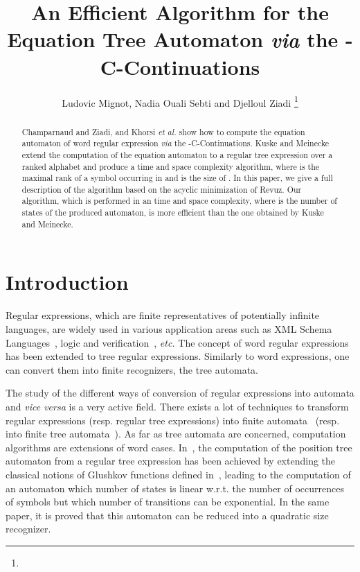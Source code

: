 \documentclass{llncs}
\begin{document}
\title{An Efficient Algorithm for the Equation Tree Automaton \emph{via} the -C-Continuations}
\author{Ludovic Mignot, Nadia Ouali Sebti and Djelloul Ziadi  \thanks{}}



\maketitle

\begin{abstract}
  Champarnaud and Ziadi, and Khorsi \emph{et al.} show how to compute the equation automaton of word regular expression  \emph{via} the -C-Continuations.
  Kuske and Meinecke extend the computation of the equation automaton to a regular tree expression  over a ranked alphabet  and produce a  time and space complexity algorithm, where  is the maximal rank of a symbol  occurring  in  and  is the size of . In this paper, we give a full description of the algorithm based on the acyclic minimization of Revuz. Our algorithm, which is performed in an  time and space complexity, where  is the number of states of the produced automaton, is more efficient than the one obtained by Kuske and Meinecke.
\end{abstract}

\section{Introduction}

Regular expressions, which are finite representatives of potentially infinite languages, are widely used in various application areas such as XML Schema Languages~\cite{xml}, logic and verification~\cite{verif}, \emph{etc.} The concept of word regular expressions  has been extended to tree regular expressions. Similarly to word expressions, one can convert them into  finite recognizers, the tree automata.
 
 The study of the different  ways of conversion of regular expressions into automata and \emph{vice versa} is a very  active  field. There exists a lot  of techniques to transform regular expressions (resp. regular tree expressions)  into finite automata~\cite{Brug,glushkov,khorsi,ZPC} (resp. into finite tree automata~\cite{automate2,lata}). As far as tree automata are concerned, computation algorithms are extensions of word cases. In~\cite{lata}, the computation of the position tree automaton from  a regular tree expression has been achieved by extending the classical notions of Glushkov functions defined  in~\cite{glushkov}, leading to the computation of an automaton which number of states is linear w.r.t. the number of  occurrences of symbols but which number of transitions can be exponential. In the same paper, it is proved that this automaton can be reduced  into a quadratic size recognizer.
 
\end{document}
